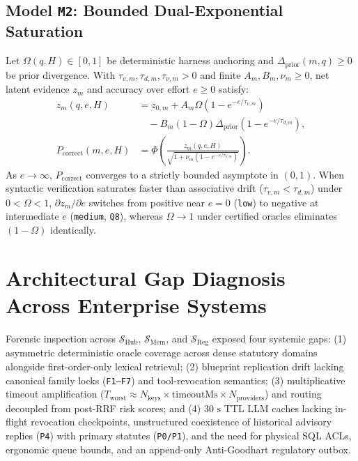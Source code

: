 \documentclass[10pt,twocolumn]{article}
\begin{document}
\subsection{Model \texttt{M2}: Bounded Dual-Exponential Saturation}

Let $\Omega(q,H) \in [0,1]$ be deterministic harness anchoring and $\Delta_{\mathrm{prior}}(m,q) \ge 0$ be prior divergence. With $\tau_{v,m},\tau_{d,m},\tau_{\nu,m} > 0$ and finite $A_m,B_m,\nu_m \ge 0$, net latent evidence $z_m$ and accuracy over effort $e \ge 0$ satisfy:
\begin{align}
z_m(q,e,H) &= z_{0,m} + A_m\Omega\!\left(1 - e^{-e/\tau_{v,m}}\right) \nonumber\\
           &\quad - B_m(1-\Omega)\Delta_{\mathrm{prior}}\!\left(1 - e^{-e/\tau_{d,m}}\right), \\
P_{\mathrm{correct}}(m,e,H) &= \Phi\!\left(\frac{z_m(q,e,H)}{\sqrt{1 + \nu_m(1 - e^{-e/\tau_{\nu,m}})}}\right).
\end{align}
As $e \to \infty$, $P_{\mathrm{correct}}$ converges to a strictly bounded asymptote in $(0,1)$. When syntactic verification saturates faster than associative drift ($\tau_{v,m} < \tau_{d,m}$) under $0 < \Omega < 1$, $\partial z_m/\partial e$ switches from positive near $e=0$ (\texttt{low}) to negative at intermediate $e$ (\texttt{medium}, \texttt{Q8}), whereas $\Omega \to 1$ under certified oracles eliminates $(1-\Omega)$ identically.

\section{Architectural Gap Diagnosis Across Enterprise Systems}

Forensic inspection across $\mathcal{S}_{\mathrm{Hub}}$, $\mathcal{S}_{\mathrm{Mem}}$, and $\mathcal{S}_{\mathrm{Reg}}$ exposed four systemic gaps: (1) asymmetric deterministic oracle coverage across dense statutory domains alongside first-order-only lexical retrieval; (2) blueprint replication drift lacking canonical family locks (\texttt{F1--F7}) and tool-revocation semantics; (3) multiplicative timeout amplification ($T_{\mathrm{worst}} \approx N_{\mathrm{keys}} \times \mathrm{timeoutMs} \times N_{\mathrm{providers}}$) and routing decoupled from post-RRF risk scores; and (4) $30\text{ s}$ TTL LLM caches lacking in-flight revocation checkpoints, unstructured coexistence of historical advisory replies (\texttt{P4}) with primary statutes (\texttt{P0/P1}), and the need for physical SQL ACLs, ergonomic queue bounds, and an append-only Anti-Goodhart regulatory outbox.
\end{document}
